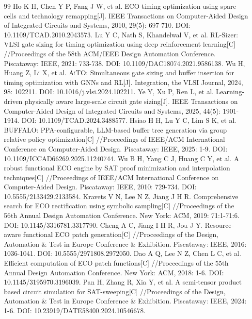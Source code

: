 \documentclass[twocolumn,10pt,fontset=windows]{ctexart}
\begin{document}
\renewcommand{\refname}{参考文献}
\footnotesize\linespread{0.95}\selectfont
\begin{thebibliography}{99}
 Ho K H, Chen Y P, Fang J W, et al. ECO timing optimization using spare cells and technology remapping[J]. IEEE Transactions on Computer-Aided Design of Integrated Circuits and Systems, 2010, 29(5): 697-710. DOI: 10.1109/TCAD.2010.2043573.
 Lu Y C, Nath S, Khandelwal V, et al. RL-Sizer: VLSI gate sizing for timing optimization using deep reinforcement learning[C] //Proceedings of the 58th ACM/IEEE Design Automation Conference. Piscataway: IEEE, 2021: 733-738. DOI: 10.1109/DAC18074.2021.9586138.
 Wu H, Huang Z, Li X, et al. AiTO: Simultaneous gate sizing and buffer insertion for timing optimization with GNNs and RL[J]. Integration, the VLSI Journal, 2024, 98: 102211. DOI: 10.1016/j.vlsi.2024.102211.
 Ye Y, Xu P, Ren L, et al. Learning-driven physically aware large-scale circuit gate sizing[J]. IEEE Transactions on Computer-Aided Design of Integrated Circuits and Systems, 2025, 44(5): 1901-1914. DOI: 10.1109/TCAD.2024.3488577.
 Hsiao H H, Lu Y C, Lim S K, et al. BUFFALO: PPA-configurable, LLM-based buffer tree generation via group relative policy optimization[C] //Proceedings of IEEE/ACM International Conference on Computer-Aided Design. Piscataway: IEEE, 2025: 1-9. DOI: 10.1109/ICCAD66269.2025.11240744.
 Wu B H, Yang C J, Huang C Y, et al. A robust functional ECO engine by SAT proof minimization and interpolation techniques[C] //Proceedings of IEEE/ACM International Conference on Computer-Aided Design. Piscataway: IEEE, 2010: 729-734. DOI: 10.5555/2133429.2133584.
 Kravets V N, Lee N Z, Jiang J H R. Comprehensive search for ECO rectification using symbolic sampling[C] //Proceedings of the 56th Annual Design Automation Conference. New York: ACM, 2019: 71:1-71:6. DOI: 10.1145/3316781.3317790.
 Cheng A C, Jiang I H R, Jou J Y. Resource-aware functional ECO patch generation[C] //Proceedings of the Design, Automation \& Test in Europe Conference \& Exhibition. Piscataway: IEEE, 2016: 1036-1041. DOI: 10.5555/2971808.2972050.
 Dao A Q, Lee N Z, Chen L C, et al. Efficient computation of ECO patch functions[C] //Proceedings of the 55th Annual Design Automation Conference. New York: ACM, 2018: 1-6. DOI: 10.1145/3195970.3196039.
 Pan H, Zhang R, Xia Y, et al. A semi-tensor product based circuit simulation for SAT-sweeping[C] //Proceedings of the Design, Automation \& Test in Europe Conference \& Exhibition. Piscataway: IEEE, 2024: 1-6. DOI: 10.23919/DATE58400.2024.10546678.

\end{thebibliography}
\end{document}
